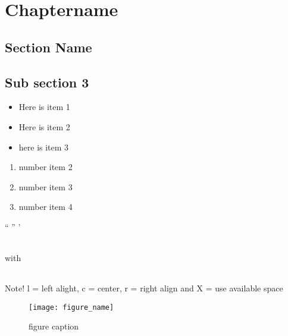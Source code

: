 \chapter{Chaptername}

\section{Section Name}

\section{Sub section 3}


\begin{itemize}
\item Here is item 1
\item Here is item 2
\item here is item 3
\end{itemize}


\begin{enumerate}
\item number item 2
\item number item 3
\item number item 4
\end{enumerate}



“   ” ’




\begin{tabular}{lll}

\end{tabular}

with

\begin{tabularx}{\textwidth}{l X l} %


\end{tabularx}

Note! l = left alight, c = center, r = right align and X = use available space



\begin{figure}
\centering
\texttt{[image: figure\_name]}
\caption{figure caption}
\label{fig:figure_id}
\end{figure}